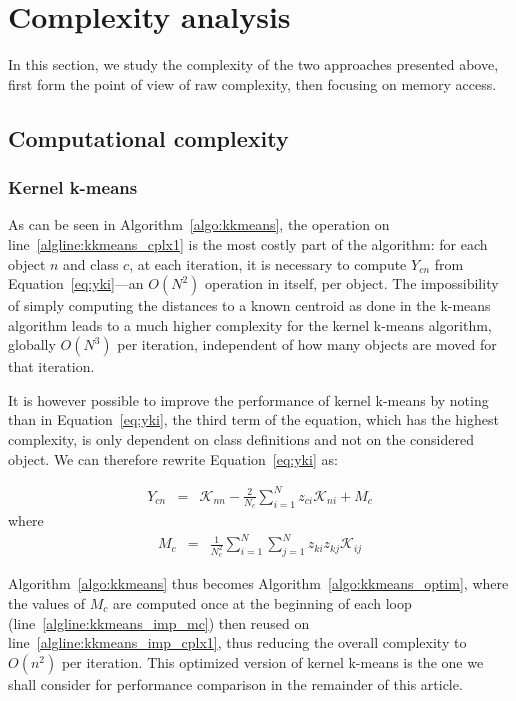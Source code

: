 \documentclass[10pt,journal,compsoc]{IEEEtran}
\newcommand{\cad}{---} %
\begin{document}
\section{Complexity analysis}
\label{sec:complexity}

In this section, we study the complexity of the two approaches presented above, first form the point of view of raw complexity, then focusing on memory access.

\subsection{Computational complexity}

\subsubsection{Kernel k-means}

As can be seen in Algorithm~\ref{algo:kkmeans}, the operation on line~\ref{algline:kkmeans_cplx1} is the most costly part of the algorithm: for each object $n$ and class $c$, at each iteration, it is necessary to compute $Y_{cn}$ from Equation~\ref{eq:yki}\cad{}an $O(N^2)$ operation in itself, per object. The impossibility of simply computing the distances to a known centroid as done in the k-means algorithm leads to a much higher complexity for the kernel k-means algorithm, globally $O(N^3)$ per iteration, independent of how many objects are moved for that iteration.

It is however possible to improve the performance of kernel k-means by noting than in Equation~\ref{eq:yki}, the third term of the equation, which has the highest complexity, is only dependent on class definitions and not on the considered object. We can therefore rewrite Equation~\ref{eq:yki} as:

\begin{eqnarray}
Y_{cn} & = & \mathcal{K}_{nn} - \frac{2}{N_c} \sum_{i=1}^{N} z_{ci} \mathcal{K}_{ni} + M_c \label{eq:yki_improved}
\end{eqnarray}
where
\begin{eqnarray}
M_c    & = & \frac{1}{N_c^2} \sum_{i=1}^{N} \sum_{j=1}^{N} z_{ki} z_{kj} \mathcal{K}_{ij} \label{eq:mc}
\end{eqnarray}

Algorithm~\ref{algo:kkmeans} thus becomes Algorithm~\ref{algo:kkmeans_optim}, where the values of $M_c$ are computed once at the beginning of each loop (line~\ref{algline:kkmeans_imp_mc}) then reused on line~\ref{algline:kkmeans_imp_cplx1}, thus reducing the overall complexity to $O(n^2)$ per iteration. This optimized version of kernel k-means is the one we shall consider for performance comparison in the remainder of this article.
\end{document}
